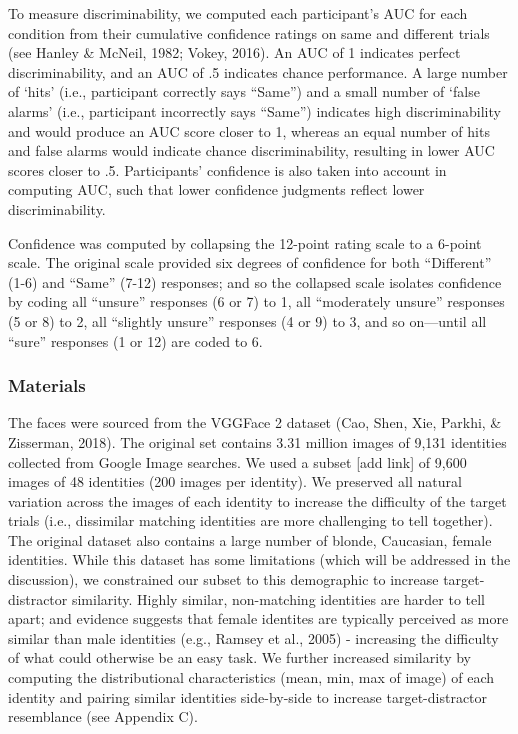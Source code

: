 \documentclass[
  english,
  man]{apa6}
\begin{document}
To measure discriminability, we computed each participant's AUC for each condition from their cumulative confidence ratings on same and different trials (see Hanley \& McNeil, 1982; Vokey, 2016). An AUC of 1 indicates perfect discriminability, and an AUC of .5 indicates chance performance. A large number of `hits' (i.e., participant correctly says ``Same'') and a small number of `false alarms' (i.e., participant incorrectly says ``Same'') indicates high discriminability and would produce an AUC score closer to 1, whereas an equal number of hits and false alarms would indicate chance discriminability, resulting in lower AUC scores closer to .5. Participants' confidence is also taken into account in computing AUC, such that lower confidence judgments reflect lower discriminability.

Confidence was computed by collapsing the 12-point rating scale to a 6-point scale. The original scale provided six degrees of confidence for both ``Different'' (1-6) and ``Same'' (7-12) responses; and so the collapsed scale isolates confidence by coding all ``unsure'' responses (6 or 7) to 1, all ``moderately unsure'' responses (5 or 8) to 2, all ``slightly unsure'' responses (4 or 9) to 3, and so on---until all ``sure'' responses (1 or 12) are coded to 6.

\hypertarget{materials}{%
\subsubsection{Materials}\label{materials}}

The faces were sourced from the VGGFace 2 dataset (Cao, Shen, Xie, Parkhi, \& Zisserman, 2018). The original set contains 3.31 million images of 9,131 identities collected from Google Image searches. We used a subset {[}add link{]} of 9,600 images of 48 identities (200 images per identity). We preserved all natural variation across the images of each identity to increase the difficulty of the target trials (i.e., dissimilar matching identities are more challenging to tell together). The original dataset also contains a large number of blonde, Caucasian, female identities. While this dataset has some limitations (which will be addressed in the discussion), we constrained our subset to this demographic to increase target-distractor similarity. Highly similar, non-matching identities are harder to tell apart; and evidence suggests that female identites are typically perceived as more similar than male identities (e.g., Ramsey et al., 2005) - increasing the difficulty of what could otherwise be an easy task. We further increased similarity by computing the distributional characteristics (mean, min, max of image) of each identity and pairing similar identities side-by-side to increase target-distractor resemblance (see Appendix C).
\end{document}
